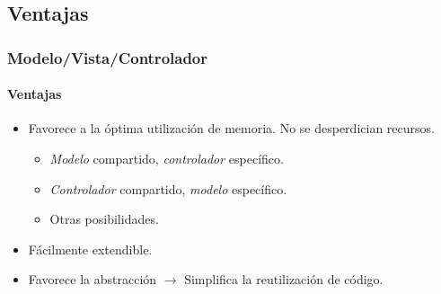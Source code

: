 \documentclass[12pt]{beamer}
\begin{document}
\subsection{Ventajas}
\begin{frame}
  \frametitle{Modelo/Vista/Controlador}
  \framesubtitle{Ventajas}

  \begin{block}{}
    \begin{itemize}
      \item Favorece a la óptima utilización de memoria. No se desperdician recursos.
        \begin{itemize}
          \item \emph{Modelo} compartido, \emph{controlador} específico.
          \medskip
          \pause
          \item \emph{Controlador} compartido, \emph{modelo} específico.
          \medskip
          \pause
          \item Otras posibilidades.
        \end{itemize}
      \medskip
      \pause
      \item Fácilmente extendible.
      \medskip
      \pause
      \item Favorece la abstracción \textcolor{oxygenorange}{$\rightarrow$} Simplifica la reutilización de código.
    \end{itemize}
  \end{block}

\end{frame}
\end{document}
